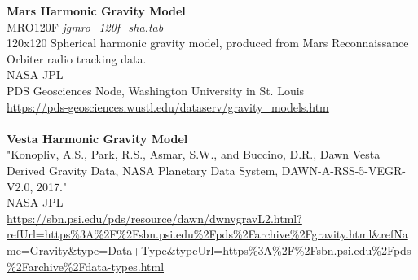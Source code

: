 \documentclass[Orbiter User Manual.tex]{subfiles}
\begin{document}
\textbf{Mars Harmonic Gravity Model}\\
MRO120F	\textit{jgmro\_120f\_sha.tab}\\
120x120 Spherical harmonic gravity model, produced from Mars Reconnaissance Orbiter radio tracking data.\\
NASA JPL\\
PDS Geosciences Node, Washington University in St. Louis\\
\url{https://pds-geosciences.wustl.edu/dataserv/gravity_models.htm}\\
\\
\textbf{Vesta Harmonic Gravity Model}\\
"Konopliv, A.S., Park, R.S., Asmar, S.W., and Buccino, D.R., Dawn Vesta Derived Gravity Data, NASA Planetary Data System, DAWN-A-RSS-5-VEGR-V2.0, 2017."\\
NASA JPL\\
\url{https://sbn.psi.edu/pds/resource/dawn/dwnvgravL2.html?refUrl=https\%3A\%2F\%2Fsbn.psi.edu\%2Fpds\%2Farchive\%2Fgravity.html&refName=Gravity&type=Data+Type&typeUrl=https\%3A\%2F\%2Fsbn.psi.edu\%2Fpds\%2Farchive\%2Fdata-types.html}\\
\\
\end{document}
